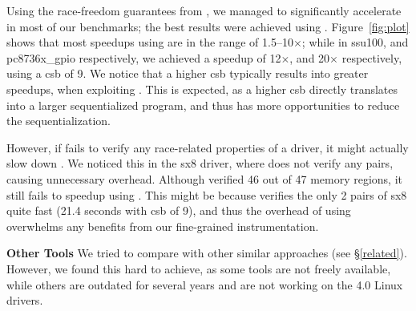 Using the race-freedom guarantees from \whoop, we managed to significantly accelerate \corral in most of our benchmarks; the best results were achieved using \yieldmr. Figure~\ref{fig:plot} shows that most speedups using \yieldmr are in the range of 1.5--10$\times$; while in ssu100, and pc8736x\_gpio respectively, we achieved a speedup of 12$\times$, and 20$\times$ respectively, using a csb of 9. We notice that a higher csb typically results into greater speedups, when exploiting \whoop. This is expected, as a higher csb directly translates into a larger sequentialized program, and thus \whoop has more opportunities to reduce the sequentialization.

However, if \whoop fails to verify any race-related properties of a driver, it might actually slow down \corral. We noticed this in the sx8 driver, where \whoop does not verify any pairs, causing unnecessary overhead. Although \whoop verified 46 out of 47 memory regions, it still fails to speedup \corral using \yieldmr. This might be because \corral verifies the only 2 pairs of sx8 quite fast (21.4 seconds with csb of 9), and thus the overhead of using \whoop overwhelms any benefits from our fine-grained instrumentation.

\noindent\textbf{Other Tools }
%
We tried to compare \whoop with other similar approaches (see \S\ref{related}). However, we found this hard to achieve, as some tools are not freely available, while others are outdated for several years and are not working on the 4.0 Linux drivers.
